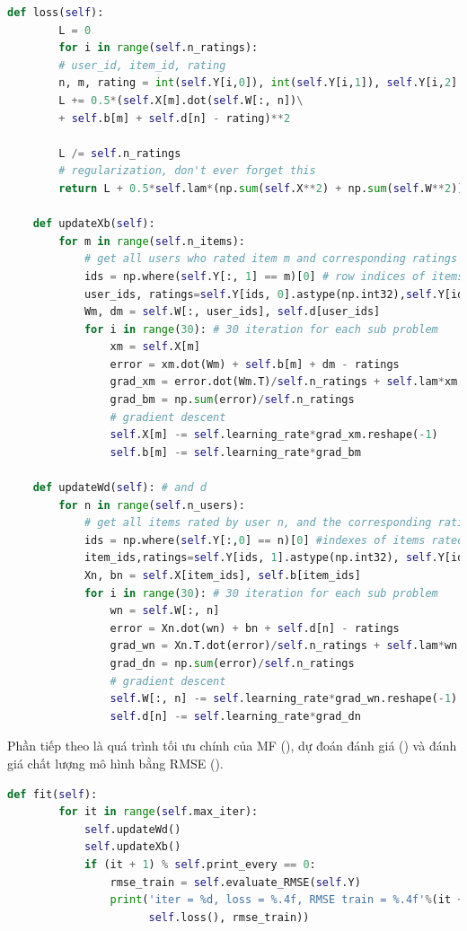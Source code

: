 \begin{lstlisting}[language=Python]
    def loss(self):
        L = 0
        for i in range(self.n_ratings):
        # user_id, item_id, rating
        n, m, rating = int(self.Y[i,0]), int(self.Y[i,1]), self.Y[i,2]
        L += 0.5*(self.X[m].dot(self.W[:, n])\
        + self.b[m] + self.d[n] - rating)**2

        L /= self.n_ratings
        # regularization, don't ever forget this
        return L + 0.5*self.lam*(np.sum(self.X**2) + np.sum(self.W**2))

    def updateXb(self):
        for m in range(self.n_items):
            # get all users who rated item m and corresponding ratings
            ids = np.where(self.Y[:, 1] == m)[0] # row indices of items m
            user_ids, ratings=self.Y[ids, 0].astype(np.int32),self.Y[ids, 2]
            Wm, dm = self.W[:, user_ids], self.d[user_ids]
            for i in range(30): # 30 iteration for each sub problem
                xm = self.X[m]
                error = xm.dot(Wm) + self.b[m] + dm - ratings
                grad_xm = error.dot(Wm.T)/self.n_ratings + self.lam*xm
                grad_bm = np.sum(error)/self.n_ratings
                # gradient descent
                self.X[m] -= self.learning_rate*grad_xm.reshape(-1)
                self.b[m] -= self.learning_rate*grad_bm

    def updateWd(self): # and d
        for n in range(self.n_users):
            # get all items rated by user n, and the corresponding ratings
            ids = np.where(self.Y[:,0] == n)[0] #indexes of items rated by n
            item_ids,ratings=self.Y[ids, 1].astype(np.int32), self.Y[ids, 2]
            Xn, bn = self.X[item_ids], self.b[item_ids]
            for i in range(30): # 30 iteration for each sub problem
                wn = self.W[:, n]
                error = Xn.dot(wn) + bn + self.d[n] - ratings
                grad_wn = Xn.T.dot(error)/self.n_ratings + self.lam*wn
                grad_dn = np.sum(error)/self.n_ratings
                # gradient descent
                self.W[:, n] -= self.learning_rate*grad_wn.reshape(-1)
                self.d[n] -= self.learning_rate*grad_dn
\end{lstlisting}
Phần tiếp theo là quá trình tối ưu chính của MF (), dự đoán
đánh giá (\pythoninline{pred}) và
đánh giá chất lượng mô hình bằng RMSE ().
\begin{lstlisting}[language=Python]
    def fit(self):
        for it in range(self.max_iter):
            self.updateWd()
            self.updateXb()
            if (it + 1) % self.print_every == 0:
                rmse_train = self.evaluate_RMSE(self.Y)
                print('iter = %d, loss = %.4f, RMSE train = %.4f'%(it + 1,
                      self.loss(), rmse_train))
\end{lstlisting}
